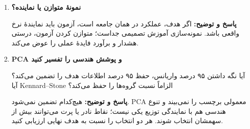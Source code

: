 \documentclass[12pt,a4paper,oneside]{report}
\newcounter{ex}[chapter]
\newenvironment{selftests}{\begin{enumerate}\setlength{\itemsep}{9pt}}{\end{enumerate}}
\newenvironment{selftest}[1]{\item\textbf{#1}\par}{\par}
\newcommand{\answer}[1]{\par{\color{teal}\bfseries پاسخ و توضیح: }#1\par}
\begin{document}
\begin{selftests}
\begin{selftest}{نمونهٔ متوازن یا نماینده؟}
\answer{اگر هدف، عملکرد در همان جامعه است، آزمون باید نمایندهٔ نرخ واقعی باشد. نمونه‌سازی آموزش تصمیمی جداست؛ متوازن کردن آزمون، درستی هشدار و برآورد فایدهٔ عملی را عوض می‌کند.}
\end{selftest}
\begin{selftest}{PCA و پوشش هندسی را تفسیر کنید}
آیا نگه داشتن ۹۵ درصد واریانس، حفظ ۹۵ درصد اطلاعات هدف را تضمین می‌کند؟ آیا Kennard--Stone الزاماً نسبت گروه‌ها را حفظ می‌کند؟
\answer{هیچ‌کدام تضمین نمی‌شود. PCA معمولی برچسب را نمی‌بیند و تنوع هندسی هم با نمایندگی توزیع یکی نیست؛ نقاط نادر یا پرت می‌توانند بیش از سهمشان انتخاب شوند. هر دو انتخاب را نسبت به هدف نهایی ارزیابی کنید.}
\end{selftest}
\end{selftests}

\end{document}

